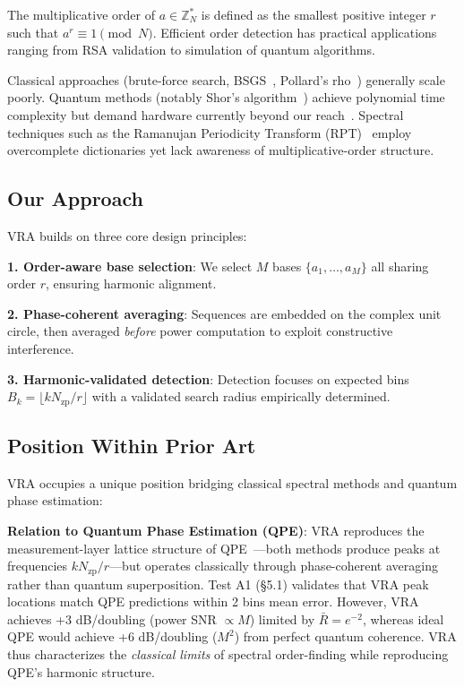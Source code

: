 \documentclass[10pt,twocolumn]{article}
\begin{document}
The multiplicative order of $a \in \mathbb{Z}_N^*$ is defined as the smallest positive integer $r$ such that $a^r \equiv 1 \pmod{N}$. Efficient order detection has practical applications ranging from RSA validation to simulation of quantum algorithms.

Classical approaches (brute-force search, BSGS~\cite{shanks1971}, Pollard's rho~\cite{pollard1978}) generally scale poorly. Quantum methods (notably Shor's algorithm~\cite{shor1997}) achieve polynomial time complexity but demand hardware currently beyond our reach~\cite{preskill2018}. Spectral techniques such as the Ramanujan Periodicity Transform (RPT)~\cite{vaidyanathan2014} employ overcomplete dictionaries yet lack awareness of multiplicative-order structure.

\subsection{Our Approach}

VRA builds on three core design principles:

\textbf{1. Order-aware base selection}: We select $M$ bases $\{a_1, \ldots, a_M\}$ all sharing order $r$, ensuring harmonic alignment.

\textbf{2. Phase-coherent averaging}: Sequences are embedded on the complex unit circle, then averaged \emph{before} power computation to exploit constructive interference.

\textbf{3. Harmonic-validated detection}: Detection focuses on expected bins $B_k = \lfloor k N_{\text{zp}}/r \rfloor$ with a validated search radius empirically determined.

\subsection{Position Within Prior Art}

VRA occupies a unique position bridging classical spectral methods and quantum phase estimation:

\textbf{Relation to Quantum Phase Estimation (QPE)}: VRA reproduces the measurement-layer lattice structure of QPE~\cite{nielsen2010}---both methods produce peaks at frequencies $kN_{\text{zp}}/r$---but operates classically through phase-coherent averaging rather than quantum superposition. Test A1 (\S5.1) validates that VRA peak locations match QPE predictions within 2 bins mean error. However, VRA achieves +3 dB/doubling (power SNR $\propto M$) limited by $\bar{R} = e^{-2}$, whereas ideal QPE would achieve +6 dB/doubling ($M^2$) from perfect quantum coherence. VRA thus characterizes the \emph{classical limits} of spectral order-finding while reproducing QPE's harmonic structure.
\end{document}
